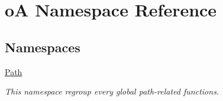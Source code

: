 \hypertarget{namespaceo_a}{}\section{oA Namespace Reference}
\label{namespaceo_a}
\subsection*{Namespaces}
\begin{DoxyCompactItemize}
\item 
 \mbox{\hyperlink{namespaceo_a_1_1_path}{Path}}
\begin{DoxyCompactList}\small\item\em This namespace regroup every global path-\/related functions. \end{DoxyCompactList}\end{DoxyCompactItemize}
